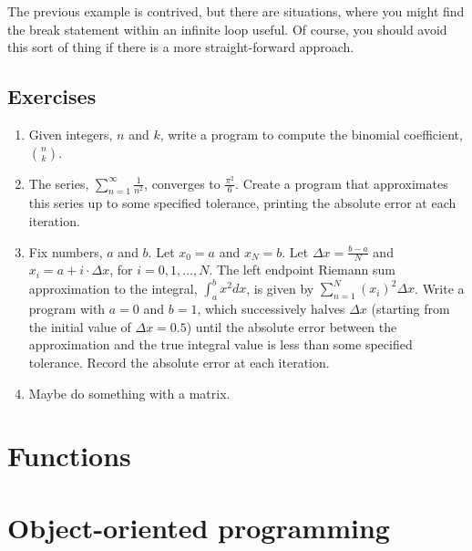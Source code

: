 \documentclass[11pt]{article}
\begin{document}
The previous example is contrived, but there are situations, where you
might find the break statement within an infinite loop useful. Of course,
you should avoid this sort of thing if there is a more straight-forward 
approach.


\subsection{Exercises}
\label{sec-4-3}
\begin{enumerate}
\item Given integers, $n$ and $k$, write a program to compute the binomial coefficient, $\displaystyle {n \choose k}$.
\item The series, $\displaystyle \sum_{n=1}^{\infty} \frac{1}{n^2}$, converges to $\displaystyle\frac{\pi^2}{6}$. Create a program that approximates this series up to some specified tolerance, printing the absolute error at each iteration.
\item Fix numbers, $a$ and $b$. Let $x_0 = a$ and $x_N=b$. Let $\Delta x = \frac{b-a}{N}$ and $x_i = a + i \cdot \Delta x$, for $i = 0, 1, \ldots, N$. The left endpoint Riemann sum approximation to the integral, $\displaystyle\int_a^b x^2 dx$, is given by $\displaystyle\sum_{n=1}^N (x_i)^2 \Delta x$. Write a program with $a=0$ and $b=1$, which successively halves $\Delta x$ (starting from the initial value of $\Delta x = 0.5$) until the absolute error between the approximation and the true integral value is less than some specified tolerance. Record the absolute error at each iteration.
\item Maybe do something with a matrix.
\end{enumerate}

\section{Functions}
\label{sec-5}
\section{Object-oriented programming}
\label{sec-6}
\section{}
\label{sec-7}
\end{document}
